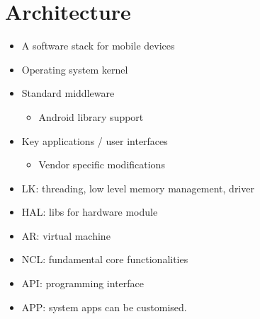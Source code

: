 \documentclass{article}
\begin{document}
\tableofcontents

\newpage

\section{Architecture}

\begin{multicols}{2}
\begin{itemize}
  \item A software stack for mobile devices
  \item Operating system kernel
  \item Standard middleware
  \begin{itemize}
    \item Android library support
  \end{itemize}
  \item Key applications / user interfaces
  \begin{itemize}
    \item Vendor specific modifications
  \end{itemize}
  \item LK: threading, low level memory management, driver
  \item HAL: libs for hardware module
  \item AR: virtual machine
  \item NCL: fundamental core functionalities
  \item API: programming interface
  \item APP: system apps can be customised.
\end{itemize}


\end{multicols}
\end{document}
